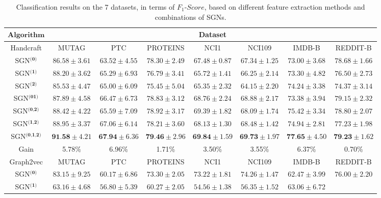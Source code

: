\documentclass[10pt,journal,compsoc]{IEEEtran}
\begin{document}
\begin{table*}[!t]
\caption{Classification results on the 7 datasets, in terms of $F_1$-$Score$, based on different feature extraction methods and combinations of SGNs.}
\centering
\renewcommand\arraystretch{1.1}
\begin{tabular}{c|cccccccc}
\hline\hline
\multicolumn{2}{c|}{ $\textbf{Algorithm}$}& \multicolumn{7}{c}{Dataset} \\
\hline
\multicolumn{2}{c|}{Handcraft}&MUTAG&PTC&PROTEINS&NCI1&NCI109&IMDB-B&REDDIT-B\\
\hline
\multicolumn{2}{c|}{SGN$^{\textbf{(0)}}$}&$86.58\pm{3.61}$&$63.52\pm{4.55}$&$78.30\pm{2.49}$&$67.48\pm{0.87}$&$67.34\pm{1.25}$&$73.00\pm{3.68}$&
$78.68\pm{1.66}$\\
\multicolumn{2}{c|}{SGN$^{\textbf{(1)}}$}&$88.20\pm{3.62}$&$65.29\pm{6.93}$&$76.79\pm{3.41}$&$65.72\pm{1.41}$&$66.25\pm{2.14}$&$73.30\pm{4.82}$&
$76.50\pm{2.73}$\\
\multicolumn{2}{c|}{SGN$^{\textbf{(2)}}$}&$85.53\pm{4.47}$&$65.00\pm{6.09}$&$75.45\pm{5.04}$&$65.35\pm{2.32}$&$64.15\pm{2.20}$&$74.24\pm{3.38}$&
$74.37\pm{3.14}$\\
\multicolumn{2}{c|}{SGN$^{\textbf{(01)}}$}&$87.89\pm{4.58}$&$66.47\pm{6.73}$&$78.83\pm{3.12}$&$68.76\pm{2.24}$&$68.88\pm{2.17}$&$73.38\pm{3.94}$&
$79.15\pm{2.32}$\\
\multicolumn{2}{c|}{SGN$^{\textbf{(0,2)}}$}&$88.42\pm{4.22}$&$65.59\pm{7.09}$&$78.92\pm{3.17}$&$69.39\pm{1.82}$&$68.09\pm{1.74}$&$75.42\pm{3.34}$&
$78.80\pm{2.07}$\\
\multicolumn{2}{c|}{SGN$^{\textbf{(1,2)}}$}&$88.95\pm{3.37}$&$67.06\pm{6.14}$&$78.21\pm{3.60}$&$68.13\pm{1.30}$&$68.48\pm{1.42}$&$74.94\pm{2.81}$&
$77.23\pm{1.98}$\\
\multicolumn{2}{c|}{SGN$^{\textbf{(0,1,2)}}$}&$\textbf{91.58}\pm{4.21}$&$\textbf{67.94}\pm{6.36}$&  $\textbf{79.46}\pm{2.96}$&  $\textbf{69.84}\pm{1.59}$&  $\textbf{69.73}\pm{1.97}$&  $\textbf{77.65}\pm{4.50}$&
$\textbf{79.23}\pm{1.62}$\\
\hline
\multicolumn{2}{c|}{Gain}&5.78\%&  6.96\%&  1.71\%&  3.50\%&  3.55\%&  6.37\%&  0.70\%\\
\hline
\hline
\multicolumn{2}{c|}{Graph2vec}&MUTAG&PTC&PROTEINS&NCI1&NCI109&IMDB-B&REDDIT-B\\
\hline
\multicolumn{2}{c|}{SGN$^{\textbf{(0)}}$}&$83.15\pm{9.25}$&$60.17\pm{6.86}$&$73.30\pm{2.05}$&$73.22\pm{1.81}$&  $74.26\pm{1.47}$&$62.47\pm{3.99}$&
$76.00\pm{2.20}$\\
\multicolumn{2}{c|}{SGN$^{\textbf{(1)}}$}&$63.16\pm{4.68}$&$56.80\pm{5.39}$&$60.27\pm{2.05}$&$54.56\pm{1.38}$&  $56.35\pm{1.52}$&$63.06\pm{6.72}$&

\end{tabular}
\end{table*}
\end{document}
